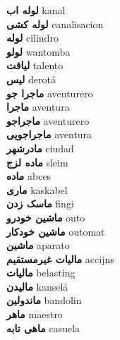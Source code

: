 \textbf{ لوله اب  } kanal \\
\textbf{ لوله کشی  } canalisacion \\
\textbf{ لوله  } cilindro \\
\textbf{ لولو  } wantomba \\
\textbf{ لیاقت  } talento \\
\textbf{ لیس  } derotá \\
\textbf{ ماجرا جو  } aventurero \\
\textbf{ ماجرا  } aventura \\
\textbf{ ماجراجو  } aventurero \\
\textbf{ ماجراجویی  } aventura \\
\textbf{ مادرشهر  } ciudad \\
\textbf{ ماده لزج  } sleim \\
\textbf{ ماده  } abces \\
\textbf{ ماری  } kaskabel \\
\textbf{ ماسک زدن  } fingi \\
\textbf{ ماشین خودرو  } outo \\
\textbf{ ماشین خودکار  } outomat \\
\textbf{ ماشین  } aparato \\
\textbf{ مالیات غیرمستقیم  } accijns \\
\textbf{ مالیات  } belasting \\
\textbf{ مالیدن  } kanselá \\
\textbf{ ماندولین  } bandolin \\
\textbf{ ماهر  } maestro \\
\textbf{ ماهی تابه  } casuela \\
